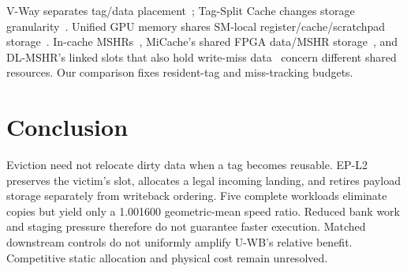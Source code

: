 \documentclass[conference,letterpaper]{IEEEtran}
\begin{document}
V-Way separates tag/data placement~\cite{vway}; Tag-Split Cache changes storage granularity~\cite{tsc}. Unified GPU memory shares SM-local register/cache/scratchpad storage~\cite{unified}. In-cache MSHRs~\cite{farkas}, MiCache's shared FPGA data/MSHR storage~\cite{micache}, and DL-MSHR's linked slots that also hold write-miss data~\cite{dlmshr} concern different shared resources. Our comparison fixes resident-tag and miss-tracking budgets.

\section{Conclusion}
Eviction need not relocate dirty data when a tag becomes reusable. EP-L2 preserves the victim's slot, allocates a legal incoming landing, and retires payload storage separately from writeback ordering. Five complete workloads eliminate copies but yield only a 1.001600 geometric-mean speed ratio. Reduced bank work and staging pressure therefore do not guarantee faster execution. Matched downstream controls do not uniformly amplify U-WB's relative benefit. Competitive static allocation and physical cost remain unresolved.

\clearpage


\end{document}
